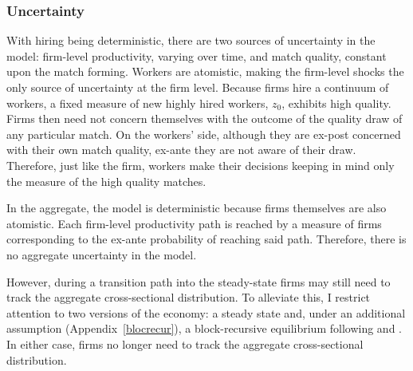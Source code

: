 \subsubsection*{Uncertainty}
With hiring being deterministic, there are two sources of uncertainty in the model: firm-level productivity, varying over time, and match quality, constant upon the match forming. Workers are atomistic, making the firm-level shocks the only source of uncertainty at the firm level.
Because firms hire a continuum of workers, a fixed measure of new highly hired workers, $z_0$, exhibits high quality. Firms then need not concern themselves with the outcome of the quality draw of any particular match. On the workers' side, although they are ex-post concerned with their own match quality, ex-ante they are not aware of their draw. Therefore, just like the firm, workers make their decisions keeping in mind only the measure of the high quality matches. 

In the aggregate, the model is deterministic because firms themselves are also atomistic. Each firm-level productivity path is reached by a measure of firms corresponding to the ex-ante probability of reaching said path. Therefore, there is no aggregate uncertainty in the model. 

However, during a transition path into the steady-state firms may still need to track the aggregate cross-sectional distribution. To alleviate this, I restrict attention to two versions of the economy: a steady state and, under an additional assumption (Appendix~\ref{blocrecur}), a block-recursive equilibrium following \textcite{menzio2011} and \textcite{schaal2017}. 
In either case, firms no longer need to track the aggregate cross-sectional distribution.

